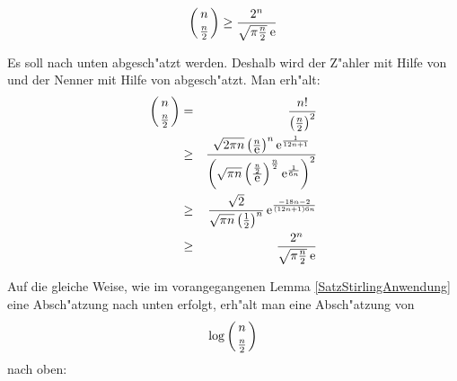 \begin{lemma}
\label{SatzStirling2Anwendung}
    \[ \left( {  n  \atop  \frac{n}{2}  } \right)
           \geq
       \frac{2^n}{ \sqrt{\pi \frac{n}{2}} \: \mbox{\rm e} }
    \]
\end{lemma}
\begin{beweis}
    Es soll nach unten abgesch"atzt werden. Deshalb wird der Z"ahler mit
    Hilfe von  und der Nenner mit Hilfe von
     abgesch"atzt. Man erh"alt:
    \begin{eqnarray}
       \left( {  n  \atop  \frac{n}{2}  } \right)
           & = &
       \frac{n!}{ \left( \frac{n}{2} \right)^2 } \nonumber
    \\ \label{Equ1LemmaStirling2}
           & \geq &
       \frac{
            \sqrt{2\pi n}
            \left( \frac{n}{\mbox{\rm e}} \right)^n
            \mbox{\rm e}^{\frac{1}{12n+1}}
       }{
            \left(
                \sqrt{\pi n}
                \left( \frac{ \frac{n}{2} }{\mbox{\rm e}} \right)^{\frac{n}{2}}
                \mbox{\rm e}^{\frac{1}{6n}}
            \right)^2
       }
    \\     & \geq &
       \frac{
           \sqrt{2}
       }{
           \sqrt{\pi n} \left( \frac{1}{2} \right)^n
       }
       \, \mbox{\rm e}^{ \frac{ -18n-2 }{ (12n + 1)6n } }
    \\     & \geq & 
       \frac{2^n}{ \sqrt{\pi \frac{n}{2}} \: \mbox{\rm e} 
       } \nonumber
    \end{eqnarray}
\end{beweis}

Auf die gleiche Weise, wie im vorangegangenen Lemma
\ref{SatzStirlingAnwendung} eine Absch"atzung nach unten erfolgt,
erh"alt man eine Absch"atzung von
\[ \log \left( {  n  \atop  \frac{n}{2}  } \right) \] nach oben:

